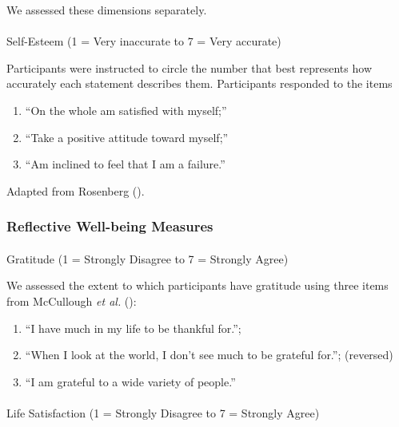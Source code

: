 \documentclass[
  single column]{article}
\makeatletter
\let\oldparagraph\paragraph
\renewcommand{\paragraph}{
    \@ifstar
      \xxxParagraphStar
      \xxxParagraphNoStar
  }
\newcommand{\xxxParagraphStar}[1]{\oldparagraph*{#1}\mbox{}}
\newcommand{\xxxParagraphNoStar}[1]{\oldparagraph{#1}\mbox{}}
\providecommand{\tightlist}{%
  \setlength{\itemsep}{0pt}\setlength{\parskip}{0pt}}\usepackage{longtable,booktabs,array}
\makeatother
\begin{document}
We assessed these dimensions separately.

\paragraph{Self-Esteem (1 = Very inaccurate to 7 = Very
accurate)}\label{self-esteem-1-very-inaccurate-to-7-very-accurate}

Participants were instructed to circle the number that best represents
how accurately each statement describes them. Participants responded to
the items

\begin{enumerate}
\def\labelenumi{\arabic{enumi}.}
\tightlist
\item
  ``On the whole am satisfied with myself;''
\item
  ``Take a positive attitude toward myself;''
\item
  ``Am inclined to feel that I am a failure.''
\end{enumerate}

Adapted from Rosenberg ().

\subsubsection{Reflective Well-being
Measures}\label{reflective-well-being-measures}

\paragraph{Gratitude (1 = Strongly Disagree to 7 = Strongly
Agree)}\label{gratitude-1-strongly-disagree-to-7-strongly-agree}

We assessed the extent to which participants have gratitude using three
items from McCullough \emph{et al.}
():

\begin{enumerate}
\def\labelenumi{(\arabic{enumi})}
\tightlist
\item
  ``I have much in my life to be thankful for.'';
\item
  ``When I look at the world, I don't see much to be grateful for.'';
  (reversed)
\item
  ``I am grateful to a wide variety of people.''
\end{enumerate}

\paragraph{Life Satisfaction (1 = Strongly Disagree to 7 = Strongly
Agree)}\label{life-satisfaction-1-strongly-disagree-to-7-strongly-agree}
\end{document}
